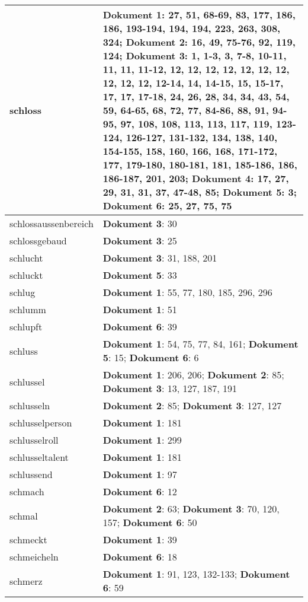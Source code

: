 \documentclass[a5paper]{article}
\begin{document}
\begin{longtable}[l]{|l|p{3in}|}
\hline
schloss & \textbf{Dokument 1}: 27, 51, 68-69, 83, 177, 186, 186, 193-194, 194, 194, 223, 263, 308, 324; \textbf{Dokument 2}: 16, 49, 75-76, 92, 119, 124; \textbf{Dokument 3}: 1, 1-3, 3, 7-8, 10-11, 11, 11, 11-12, 12, 12, 12, 12, 12, 12, 12, 12, 12, 12, 12-14, 14, 14-15, 15, 15-17, 17, 17, 17-18, 24, 26, 28, 34, 34, 43, 54, 59, 64-65, 68, 72, 77, 84-86, 88, 91, 94-95, 97, 108, 108, 113, 113, 117, 119, 123-124, 126-127, 131-132, 134, 138, 140, 154-155, 158, 160, 166, 168, 171-172, 177, 179-180, 180-181, 181, 185-186, 186, 186-187, 201, 203; \textbf{Dokument 4}: 17, 27, 29, 31, 31, 37, 47-48, 85; \textbf{Dokument 5}: 3; \textbf{Dokument 6}: 25, 27, 75, 75 \\
\hline
schlossaussenbereich & \textbf{Dokument 3}: 30 \\
\hline
schlossgebaud & \textbf{Dokument 3}: 25 \\
\hline
schlucht & \textbf{Dokument 3}: 31, 188, 201 \\
\hline
schluckt & \textbf{Dokument 5}: 33 \\
\hline
schlug & \textbf{Dokument 1}: 55, 77, 180, 185, 296, 296 \\
\hline
schlumm & \textbf{Dokument 1}: 51 \\
\hline
schlupft & \textbf{Dokument 6}: 39 \\
\hline
schluss & \textbf{Dokument 1}: 54, 75, 77, 84, 161; \textbf{Dokument 5}: 15; \textbf{Dokument 6}: 6 \\
\hline
schlussel & \textbf{Dokument 1}: 206, 206; \textbf{Dokument 2}: 85; \textbf{Dokument 3}: 13, 127, 187, 191 \\
\hline
schlusseln & \textbf{Dokument 2}: 85; \textbf{Dokument 3}: 127, 127 \\
\hline
schlusselperson & \textbf{Dokument 1}: 181 \\
\hline
schlusselroll & \textbf{Dokument 1}: 299 \\
\hline
schlusseltalent & \textbf{Dokument 1}: 181 \\
\hline
schlussend & \textbf{Dokument 1}: 97 \\
\hline
schmach & \textbf{Dokument 6}: 12 \\
\hline
schmal & \textbf{Dokument 2}: 63; \textbf{Dokument 3}: 70, 120, 157; \textbf{Dokument 6}: 50 \\
\hline
schmeckt & \textbf{Dokument 1}: 39 \\
\hline
schmeicheln & \textbf{Dokument 6}: 18 \\
\hline
schmerz & \textbf{Dokument 1}: 91, 123, 132-133; \textbf{Dokument 6}: 59 \\

\end{longtable}
\end{document}
